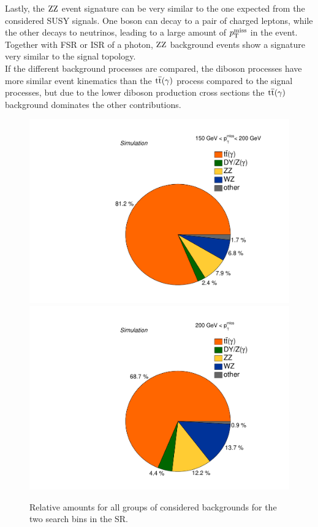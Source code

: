 Lastly, the $\mathrm{Z}\mathrm{Z}$ event signature can be very similar to the one expected from the considered SUSY signals. One boson can decay to a pair of charged leptons, while the other decays to neutrinos, leading to a large amount of $p_{\mathrm{T}}^\text{miss}$ in the event. Together with FSR or ISR of a photon, $\mathrm{Z}\mathrm{Z}$ background events show a signature very similar to the signal topology.\\
If the different background processes are compared, the diboson processes have more similar event kinematics than the ${\mathrm{t}\overline{\mathrm{t}}}(\gamma)$ process compared to the signal processes, but due to the lower diboson production cross sections the ${\mathrm{t}\overline{\mathrm{t}}}(\gamma)$ background dominates the other contributions.
\begin{figure}[tbp]
 \centering
 \includegraphics[width=\pairwidth]{figures/figures/pie1}
 \includegraphics[width=\pairwidth]{figures/figures/pie2}
 \caption{Relative amounts for all groups of considered backgrounds for the two search bins in the SR.}
 \label{fig:PieCharts}
\end{figure}
